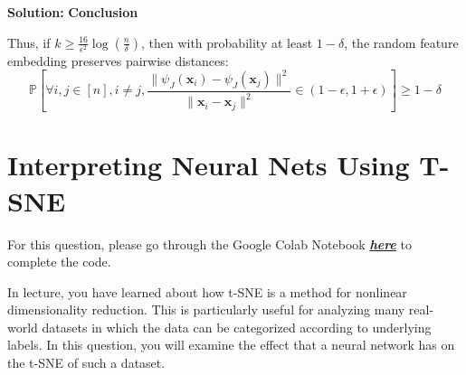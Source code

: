 \documentclass{article}
\newcommand{\Question}[1]{\Large \section{ #1 } \normalsize}
\newenvironment{solution}{\color{blue} \smallskip \textbf{Solution:}}{}
\begin{document}
\begin{enumerate}
\begin{solution}
\textbf{Conclusion}

Thus, if \(k \geq \frac{16}{\epsilon^2} \log \left( \frac{n}{\delta} \right)\), then with probability at least \(1 - \delta\), the random feature embedding preserves pairwise distances:
\[
\mathbb{P} \left[ \forall i, j \in [n], i \neq j, \frac{\|\psi_J(\mathbf{x}_i) - \psi_J(\mathbf{x}_j)\|^2}{\|\mathbf{x}_i - \mathbf{x}_j\|^2} \in (1 - \epsilon, 1 + \epsilon) \right] \geq 1 - \delta
\]



    
\end{solution}
\end{enumerate}

\newpage
\Question{Interpreting Neural Nets Using T-SNE}
For this question, please go through the Google Colab Notebook \href{https://colab.research.google.com/drive/1yiRHfxSMqqzzE-3z7Omqhk_-YV37Bily?usp=sharing}{\textbf{\emph{here}}} to complete the code. 

In lecture, you have learned about how t-SNE is a method for nonlinear dimensionality reduction. This is particularly useful for analyzing many real-world datasets in which the data can be categorized according to underlying labels. In this question, you will examine the effect that a neural network has on the t-SNE of such a dataset.
\end{document}
